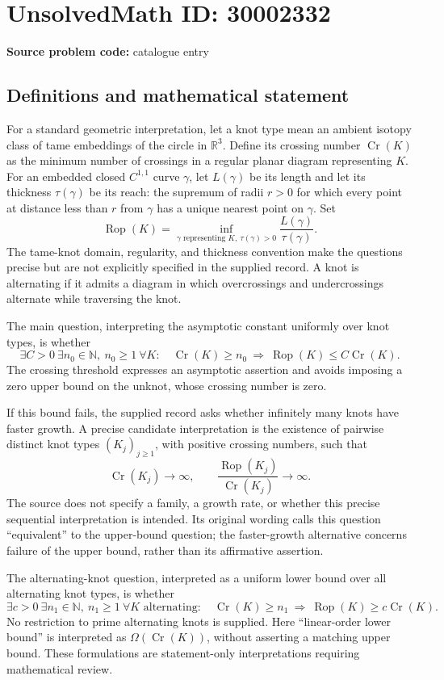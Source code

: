 \documentclass[11pt]{article}
\newcommand{\N}{\mathbb{N}}
\newcommand{\R}{\mathbb{R}}
\begin{document}
\section*{UnsolvedMath ID: 30002332}
\textbf{Source problem code:} catalogue entry
\subsection{Definitions and mathematical statement}
For a standard geometric interpretation, let a knot type mean an ambient isotopy class of tame embeddings of the circle in \(\R^3\). Define its crossing number \(\operatorname{Cr}(K)\) as the minimum number of crossings in a regular planar diagram representing \(K\). For an embedded closed \(C^{1,1}\) curve \(\gamma\), let \(L(\gamma)\) be its length and let its thickness \(\tau(\gamma)\) be its reach: the supremum of radii \(r>0\) for which every point at distance less than \(r\) from \(\gamma\) has a unique nearest point on \(\gamma\). Set
\[
\operatorname{Rop}(K)=\inf_{\gamma\text{ representing }K,\ \tau(\gamma)>0}\frac{L(\gamma)}{\tau(\gamma)}.
\]
The tame-knot domain, regularity, and thickness convention make the questions precise but are not explicitly specified in the supplied record. A knot is alternating if it admits a diagram in which overcrossings and undercrossings alternate while traversing the knot.

The main question, interpreting the asymptotic constant uniformly over knot types, is whether
\[
\exists C>0\ \exists n_0\in\N,\ n_0\ge1\ \forall K:\quad
\operatorname{Cr}(K)\ge n_0\ \Longrightarrow\ \operatorname{Rop}(K)\le C\operatorname{Cr}(K).
\]
The crossing threshold expresses an asymptotic assertion and avoids imposing a zero upper bound on the unknot, whose crossing number is zero.

If this bound fails, the supplied record asks whether infinitely many knots have faster growth. A precise candidate interpretation is the existence of pairwise distinct knot types \((K_j)_{j\ge1}\), with positive crossing numbers, such that
\[
\operatorname{Cr}(K_j)\longrightarrow\infty,
\qquad
\frac{\operatorname{Rop}(K_j)}{\operatorname{Cr}(K_j)}\longrightarrow\infty.
\]
The source does not specify a family, a growth rate, or whether this precise sequential interpretation is intended. Its original wording calls this question ``equivalent'' to the upper-bound question; the faster-growth alternative concerns failure of the upper bound, rather than its affirmative assertion.

The alternating-knot question, interpreted as a uniform lower bound over all alternating knot types, is whether
\[
\exists c>0\ \exists n_1\in\N,\ n_1\ge1\ \forall K\text{ alternating}:\quad
\operatorname{Cr}(K)\ge n_1\ \Longrightarrow\ \operatorname{Rop}(K)\ge c\operatorname{Cr}(K).
\]
No restriction to prime alternating knots is supplied. Here ``linear-order lower bound'' is interpreted as \(\Omega(\operatorname{Cr}(K))\), without asserting a matching upper bound. These formulations are statement-only interpretations requiring mathematical review.
\end{document}
